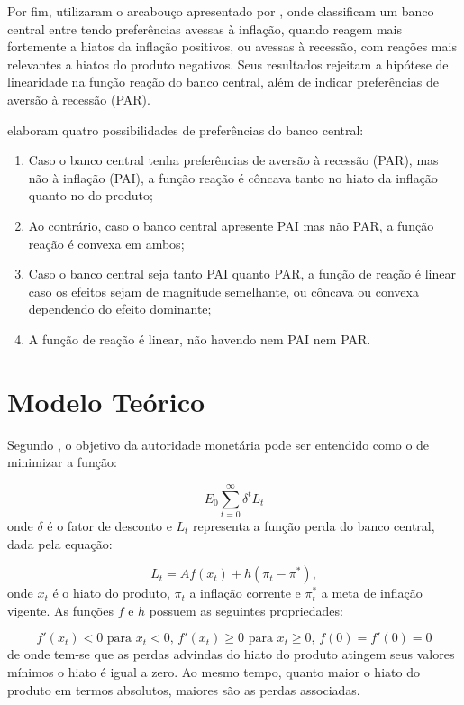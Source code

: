 \documentclass[
	article,			%
	11pt,				%
	oneside,			%
	a4paper,			%
	english,			%
	brazil,				%
	]{abntex2}
\begin{document}
	Por fim,  utilizaram o arcabouço apresentado por , onde classificam um banco central entre tendo preferências avessas à inflação, quando reagem mais fortemente a hiatos da inflação positivos, ou avessas à recessão, com reações mais relevantes a hiatos do produto negativos. Seus resultados rejeitam a hipótese de linearidade na função reação do banco central, além de indicar preferências de aversão à recessão (PAR).
	
	 elaboram quatro possibilidades de preferências do banco central:
	
	\begin{enumerate}
		\item Caso o banco central tenha preferências de aversão à recessão (PAR), mas não à inflação (PAI), a função reação é côncava tanto no hiato da inflação quanto no do produto;
		\item Ao contrário, caso o banco central apresente PAI mas não PAR, a função reação é convexa em ambos;
		\item Caso o banco central seja tanto PAI quanto PAR, a função de reação é linear caso os efeitos sejam de magnitude semelhante, ou côncava ou convexa dependendo do efeito dominante;
		\item A função de reação é linear, não havendo nem PAI nem PAR.
	\end{enumerate}
	
	\section{Modelo Teórico}
	
	Segundo , o objetivo da autoridade monetária pode ser entendido como o de minimizar a função:
	
	\begin{equation}  \label{funcao_perda}
		E_0\sum_{t=0}^{\infty}\delta^t L_t
	\end{equation}
	onde $\delta$ é o fator de desconto e $L_{t}$ representa a função perda do banco central, dada pela equação:
	
	\begin{equation}
		L_t = Af(x_t) + h(\pi_t - \pi^*),
	\end{equation}
	onde $x_t$ é o hiato do produto, $\pi_t$ a inflação corrente e $\pi_t^*$ a meta de inflação vigente. As funções $f$ e $h$ possuem as seguintes propriedades:
	
	\begin{equation}
		f'(x_t) < 0 \mbox{ para } x_t < 0 \mbox{, } f'(x_t) \geq 0 \mbox{ para } x_t \geq 0 \mbox{, } f(0) = f'(0) = 0
	\end{equation}
	de onde tem-se que as perdas advindas do hiato do produto atingem seus valores mínimos o hiato é igual a zero. Ao mesmo tempo, quanto maior o hiato do produto em termos absolutos, maiores são as perdas associadas.
\end{document}
